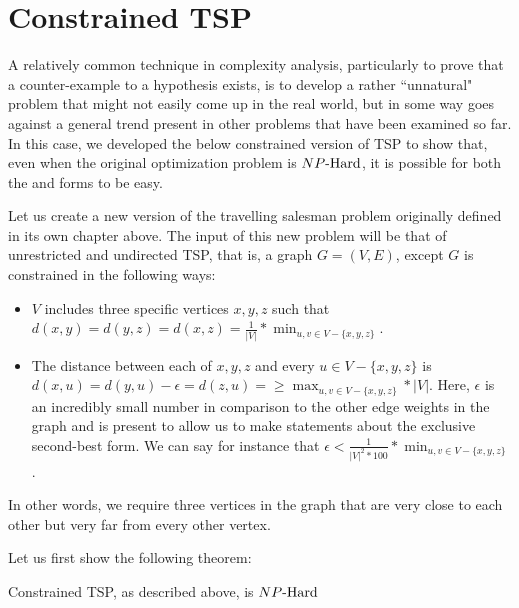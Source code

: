 \section{Constrained TSP}
A relatively common technique in complexity analysis, particularly to prove that a counter-example to a hypothesis exists, is to develop a rather ``unnatural" problem that might not easily come up in the real world, but in some way goes against a general trend present in other problems that have been examined so far. In this case, we developed the below constrained version of TSP to show that, even when the original optimization problem is ${NP\text{-Hard{}}}$, it is possible for both the \exob{} and \inob{} forms to be easy.
\begin{definition}
    Let us create a new version of the travelling salesman problem originally defined in its own chapter above. The input of this new problem will be that of unrestricted and undirected TSP, that is, a graph $G=(V,E)$, except $G$ is constrained in the following ways:
    \begin{itemize}
        \item $V$ includes three specific vertices $x,y,z$ such that $d(x,y) = d(y,z) = d(x,z) = \frac{1}{|V|}*\min_{u,v \in V - \{x,y,z\}} $.
        \item The distance between each of $x,y,z$ and every $u \in V - \{x,y,z\}$ is $d(x,u) = d(y,u)  - \epsilon  = d(z,u)= \geq \max_{u,v \in V - \{x,y,z\}}*|V|$. Here, $\epsilon$ is an incredibly small number in comparison to the other edge weights in the graph and is present to allow us to make statements about the exclusive second-best form. We can say for instance that $\epsilon < \frac{1}{|V|^2*100}*\min_{u,v \in V - \{x,y,z\}}$.
    \end{itemize}
    In other words, we require three vertices in the graph that are very close to each other but very far from every other vertex. 
\end{definition}
Let us first show the following theorem:
\begin{theorem}
    Constrained TSP, as described above, is ${NP\text{-Hard{}}}$
\end{theorem}
